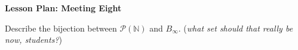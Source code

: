 \documentclass[12pt]{amsart}
\theoremstyle{definition}
\begin{document}
\begin{center}
\textbf{\Huge
Lesson Plan: Meeting Eight}
\end{center}
\vspace{.5in}


Describe the bijection between $\mathcal{P}(\mathbb{N})$ and $B_{\infty}$. (\textit{what set should that really be now, students?})
\end{document}
